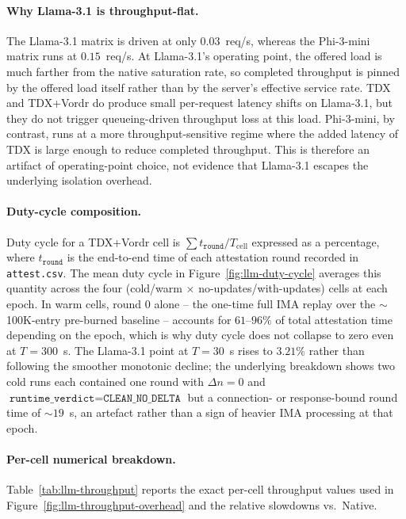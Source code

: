 \paragraph{Why Llama-3.1 is throughput-flat.}
The Llama-3.1 matrix is driven at only $0.03$~req/s, whereas the
Phi-3-mini matrix runs at $0.15$~req/s. At Llama-3.1's operating
point, the offered load is much farther from the native saturation
rate, so completed throughput is pinned by the offered load itself
rather than by the server's effective service rate. TDX and TDX+Vordr
do produce small per-request latency shifts on Llama-3.1, but they do
not trigger queueing-driven throughput loss at this load. Phi-3-mini,
by contrast, runs at a more throughput-sensitive regime where the
added latency of TDX is large enough to reduce completed throughput.
This is therefore an artifact of operating-point choice, not evidence
that Llama-3.1 escapes the underlying isolation overhead.

\paragraph{Duty-cycle composition.}
Duty cycle for a TDX+Vordr cell is $\sum t_{\texttt{round}} / T_{\text{cell}}$
expressed as a percentage, where $t_{\texttt{round}}$ is the end-to-end
time of each attestation round recorded in \texttt{attest.csv}. The
mean duty cycle in Figure~\ref{fig:llm-duty-cycle} averages this
quantity across the four (cold/warm $\times$ no-updates/with-updates) cells
at each epoch. In warm cells, round 0 alone -- the one-time full IMA
replay over the $\sim$100K-entry pre-burned baseline -- accounts for
$61$--$96\%$ of total attestation time depending on the epoch, which
is why duty cycle does not collapse to zero even at $T{=}300$~s.
The Llama-3.1 point at $T{=}30$~s rises to $3.21\%$ rather than
following the smoother monotonic decline; the underlying breakdown
shows two cold runs each contained one round with $\Delta n{=}0$ and
$\texttt{runtime\_verdict}{=}\texttt{CLEAN\_NO\_DELTA}$ but a connection-
or response-bound round time of $\sim$$19$~s, an artefact rather than
a sign of heavier IMA processing at that epoch.

\paragraph{Per-cell numerical breakdown.}
Table~\ref{tab:llm-throughput} reports the exact per-cell throughput
values used in Figure~\ref{fig:llm-throughput-overhead} and the
relative slowdowns vs.\ Native.

